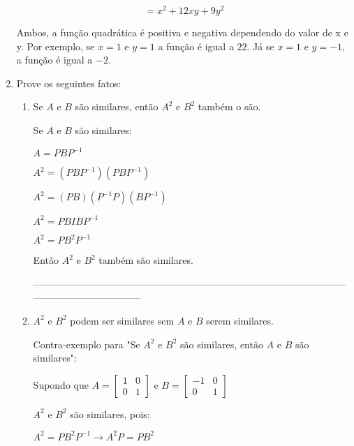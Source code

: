 \documentclass[leqno]{article}
\numberwithin{equation}{section}
\begin{document}
\begin{enumerate}
\begin{sol}
		$$= x^2 + 12xy + 9y^2 $$  
		
		Ambos, a função quadrática é positiva e negativa dependendo do valor de x e y.
		Por exemplo, se $x = 1$ e $y = 1$ a função é igual a $22$.
		Já se $x = 1$ e $y = -1$, a função é igual a $-2$.
		\end{sol} 
		
		
		\item Prove os seguintes fatos:
		
		\begin{enumerate}
			
			\item Se $A$ e $B$ são similares, então $A^2$ e $B^2$ também o são.
			
			\begin{sol} 
				Se $A$ e $B$ são similares:
				
				$A = PBP^{-1}$  
				
				$A^2 = (PBP^{-1})(PBP^{-1})$
				
				$A^2 = (PB)(P^{-1}P)(BP^{-1})$
				
				$A^2 = PBIBP^{-1}$
				
				$A^2 = PB^2P^{-1}$
				
				Então $A^2$ e $B^2$ também são similares.
				
				---------------------------------------------------------------------------------------------------------------------------------
			\end{sol} 
			
			\item $A^2$ e $B^2$ podem ser similares sem $A$ e $B$ serem similares.
			
			Contra-exemplo para "Se $A^2$ e $B^2$ são similares, então $A$ e $B$ são similares":
			
			Supondo que $A = \begin{bmatrix}
				1 & 0 \\
				0 & 1
			\end{bmatrix}$ e $B = \begin{bmatrix}
				-1 & 0 \\
				0 & 1
			\end{bmatrix}$
			
			$A^2$ e $B^2$ são similares, pois:
			
			$A^2 = PB^2P^{-1} \longrightarrow A^2P = PB^2$
			

\end{enumerate}
\end{enumerate}
\end{document}

